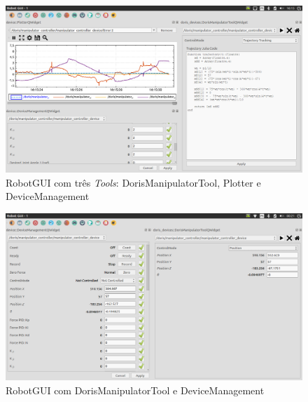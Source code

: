 \begin{figure}[!h]
  \centering
  \includegraphics[width=\linewidth]{./img/screenshot/sc1.png}
  \caption{RobotGUI com três \textit{Tools}: DorisManipulatorTool, Plotter e DeviceManagement}
  \label{fig:screenshot1}
\end{figure}


\begin{figure}[!h]
  \centering
  \includegraphics[width=\linewidth]{./img/screenshot/sc2.png}
  \caption{RobotGUI com DorisManipulatorTool e DeviceManagement}
  \label{fig:screenshot2}
\end{figure}

